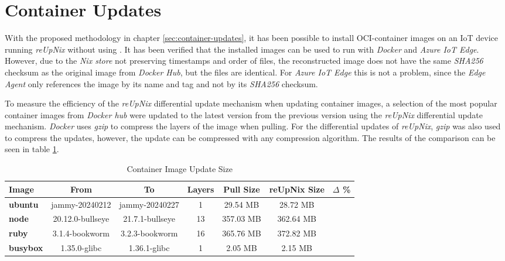 \section{Container Updates}
With the proposed methodology in chapter \ref{sec:container-updates}, it has been possible
to install \ac{OCI}-container images on an \ac{IoT} device running \textit{reUpNix} without
using . It has been verified that the installed images can be used
to run with \textit{Docker} and \textit{Azure IoT Edge}.
However, due to the \textit{Nix store}
not preserving timestamps and order of files,
the reconstructed image does not have the same \textit{SHA256} checksum as the
original image from \textit{Docker Hub}, but the files are identical. For
\textit{Azure IoT Edge} this is not a problem, since the \textit{Edge Agent} only
references the image by its name and tag and not by its \textit{SHA256} checksum.

To measure the efficiency of the \textit{reUpNix} differential update mechanism
when updating container images, a selection of the most popular container images
from \textit{Docker hub} were updated to the latest version from the previous version
using the \textit{reUpNix} differential update mechanism. \textit{Docker} uses
\textit{gzip} to compress the layers of the image when pulling. For the differential
updates of \textit{reUpNix}, \textit{gzip} was also used to compress the updates,
however, the update can be compressed with any compression algorithm.
The results of the
comparison can be seen in table \ref{tab:container-update-size}.

\begin{table}[H]
	\centering
  \footnotesize
	\begin{tabular}{l|c|c|c|c|c|c}
	\toprule
	 Image & From& To & Layers & Pull Size & reUpNix Size &$\Delta$ \% \\
	\midrule
    \textbf{ubuntu} & jammy-20240212 & jammy-20240227 & 1 & 29.54 MB &28.72 MB & \color{ba-green}{- 2.77 \%} \\
    \textbf{node} & 20.12.0-bullseye & 21.7.1-bullseye & 13 & 357.03 MB & 362.64 MB & \color{ba-red}{+ 1.57 \%} \\
    \textbf{ruby} & 3.1.4-bookworm & 3.2.3-bookworm & 16 & 365.76 MB & 372.82 MB & \color{ba-red}{+ 1.93 \%} \\
    \textbf{busybox} & 1.35.0-glibc & 1.36.1-glibc & 1 & 2.05 MB & 2.15 MB & \color{ba-red}{+ 4.87 \%} \\
	\bottomrule
	\end{tabular}
	\caption{Container Image Update Size}
	\label{tab:container-update-size}
\end{table}

